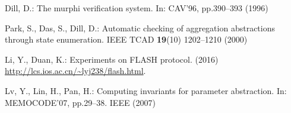 \documentclass{llncs-new}
\begin{document}
\begin{thebibliography}{50}
Dill, D.:
\newblock The murphi verification system.
\newblock In: CAV'96, pp.390--393 (1996)

Park, S., Das, S., Dill, D.:
\newblock Automatic checking of aggregation abstractions through state
  enumeration.
\newblock IEEE TCAD \textbf{19}(10) 1202--1210 (2000)

Li, Y., Duan, K.:
\newblock Experiments on FLASH protocol. (2016)
  \url{http://lcs.ios.ac.cn/~lyj238/flash.html}.

Lv, Y., Lin, H., Pan, H.:
\newblock Computing invariants for parameter abstraction.
\newblock In: MEMOCODE'07, pp.29--38. IEEE (2007)

\end{thebibliography}
\end{document}
